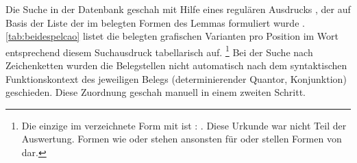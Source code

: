 Die Suche in der Datenbank geschah
mit Hilfe
eines regulären Ausdrucks \autocite[dazu z.\,B.][33--37]{perkuhnetal2012}, der
auf Basis der Liste der im \CAO{} belegten Formen des Lemmas
 formuliert wurde \autocites(mit allen Deklinationsformen insgesamt
ca.~2.050 Belege)[vgl.][166--168]{wmu1}. \cref{tab:beidespelcao} listet die
belegten grafischen Varianten pro Position im Wort entsprechend diesem
Suchausdruck tabellarisch auf.%
%
	\footnote{Die einzige im  verzeichnete Form mit
		 ist  \autocite[166]{wmu1}: 
		 \autocites(Straßburg, 1294)[\pno~N~674,
		484.18]{cao5}. Diese Urkunde war nicht Teil der Auswertung. Formen wie
		 oder  stehen ansonsten für   oder stellen Formen von   dar.}
%
Bei der Suche nach Zeichenketten wurden die Belegstellen nicht automatisch nach
dem syntaktischen Funktionskontext des jeweiligen Belegs (determinierender
Quantor, Konjunktion) geschieden. Diese Zuordnung geschah manuell in einem
zweiten Schritt.


